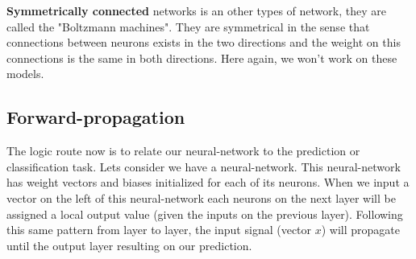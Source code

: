 		\textbf{Symmetrically connected} networks is an other types of network, they are called the "Boltzmann machines". They are symmetrical in the sense that connections between neurons exists in the two directions and the weight on this connections is the same in both directions. Here again, we won't work on these models.


	\subsection{Forward-propagation}
	\label{sec:forward_propagation}
		The logic route now is to relate our neural-network to the prediction or classification task. Lets consider we have a neural-network. This neural-network has weight vectors and biases initialized for each of its neurons. When we input a vector on the left of this neural-network each neurons on the next layer will be assigned a local output value (given the inputs on the previous layer). Following this same pattern from layer to layer, the input signal (vector $x$) will propagate until the output layer resulting on our prediction.

